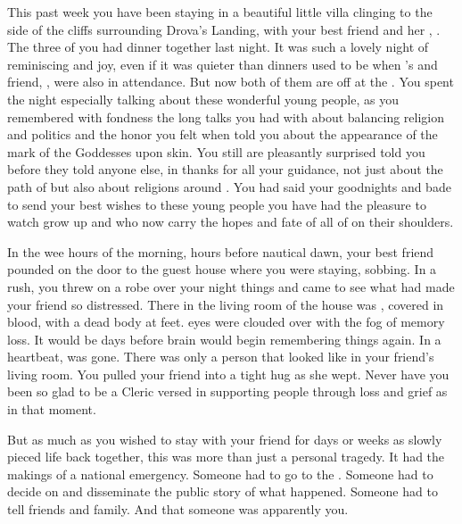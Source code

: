 \documentclass[char]{GL2020}
\begin{document}
This past week you have been staying in a beautiful little villa clinging to the side of the cliffs surrounding Drova’s Landing, with your best friend and her \cHeadDiplomat{\spouse}, \cHeadDiplomat{}. The three of you had dinner together last night. It was such a lovely night of reminiscing and joy, even if it was quieter than dinners used to be when \cHeadDiplomat{}’s \cPresident{\nibling} \cPresident{\intro} and \cPresident{\their} friend, \cInitiate{\intro}, were also in attendance. But now both of them are off at the \pSc{}. You spent the night especially talking about these wonderful young people, as you remembered with fondness the long talks you had with \cPresident{} about balancing religion and politics and the honor you felt when \cInitiate{} told you about the appearance of the mark of the Goddesses upon \cInitiate{\their} skin. You still are pleasantly surprised \cInitiate{} told you before they told anyone else, in thanks for all your guidance, not just about the path of \cEbb{} but also about religions around \pEarth{}. You had said your goodnights and bade \cHeadDiplomat{} to send your best wishes to these young people you have had the pleasure to watch grow up and who now carry the hopes and fate of all of \pEarth{} on their shoulders.

In the wee hours of the morning, hours before nautical dawn, your best friend pounded on the door to the guest house where you were staying, sobbing. In a rush, you threw on a robe over your night things and came to see what had made your friend so distressed. There in the living room of the house was \cHeadDiplomat{}, covered in blood, with a dead body at \cHeadDiplomat{\their} feet. \cHeadDiplomat{\Their} eyes were clouded over with the fog of memory loss. It would be days before \cHeadDiplomat{\their} brain would begin remembering things again. In a heartbeat, \cHeadDiplomat{} was gone. There was only a person that looked like \cHeadDiplomat{\them} in your friend’s living room. You pulled your friend into a tight hug as she wept. Never have you been so glad to be a Cleric versed in supporting people through loss and grief as in that moment. 

But as much as you wished to stay with your friend for days or weeks as \cHeadDiplomat{\they} slowly pieced \cHeadDiplomat{\their} life back together, this was more than just a personal tragedy. It had the makings of a national emergency. Someone had to go to the \pSchool{}. Someone had to decide on and disseminate the public story of what happened. Someone had to tell \cHeadDiplomat{\their} friends and family. And that someone was apparently you.
\end{document}
